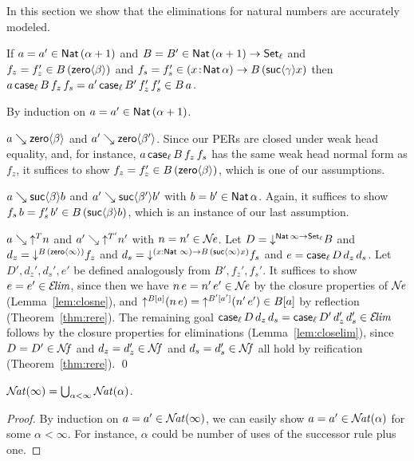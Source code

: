 \documentclass[acmlarge,review,anonymous]{acmart}\settopmatter{printfolios=true}
\makeatletter
\newenvironment{proof*}[1][\proofname]{\par
  \normalfont \topsep6\p@\@plus6\p@\relax
  \trivlist
  \item[\@proofindent\hskip\labelsep
        {\@proofnamefont #1\@addpunct{.}}]\ignorespaces
}{%
  \endtrivlist\@endpefalse
}
\makeatother
\begin{document}
In this section we show that the eliminations for natural numbers are accurately modeled.
\begin{lemma}[Case]
  \label{lem:case}
If\/ $a = a' \in \Nat (\alpha+1)$
and $B = B' \in \Nat (\alpha+1) \to \Set[\ell]$
and $f_z = f_z' \in B\,(\zero \beta)$
and $f_s = f_s' \in \funT x {\Nat \alpha} B\,(\suc \gamma x)$
then $a\,\case[\ell] B {f_z}{f_s} = a'\,\case[\ell] {B'} {f_z'}{f_s'} \in B\,a$.
\end{lemma}
\begin{proof*}
By induction on $a = a' \in \Nat(\alpha+1)$.
\begin{caselist}

\nextcase $a \evalsto \zero \beta$ and $a' \evalsto \zero{\beta'}$.
Since our PERs are closed under weak head equality,
and, for instance, $a\, \case[\ell] B {f_z}{f_s}$ has the same weak head normal form as $f_z$,
it suffices to show $f_z = f_z' \in B\,(\zero \beta)$, which is one of our assumptions.

\nextcase $a \evalsto \suc \beta b$ and $a' \evalsto \suc {\beta'}{b'}$ with $b = b' \in \Nat \alpha$.
Again, it suffices to show
$f_s\,b = f_s'\,b' \in B\,(\suc \beta b)$, which is an instance of our last assumption.

\nextcase $a \evalsto \up T n$ and $a' \evalsto \up {T'} n'$ with $n = n' \in \NE$.
Let $D = \down{\Nat \infty \to \Set[\ell]} B$
and $d_z = \down{B\,(\zero \infty)} f_z$
and $d_s = \down{\funS x {\Nat\,\infty} {B\,(\suc \infty x)}} f_s$
and $e = \case[\ell] D {d_z}{d_s}$.
Let $D',d_z',d_s',e'$ be defined analogously from $B',f_z',f_s'$.  It suffices to show $e = e' \in \ELIM$, since then we have $n\,e = n'\,e' \in \NE$ by the closure properties of $\NE$ (Lemma~\ref{lem:closne}),
and $\up{B[a]} (n\,e) = \up{B'[a']} (n'\,e') \in B[a]$ by reflection (Theorem~\ref{thm:rere}).
The remaining goal $\case[\ell] D {d_z}{d_s} = \case[\ell] {D'} {d_z'}{d_s'} \in \ELIM$ follows by the closure properties for eliminations (Lemma~\ref{lem:closelim}), since $D = D' \in \NF$ and $d_z = d_z' \in \NF$ and $d_s = d_s' \in \NF$ all hold by reification (Theorem~\ref{thm:rere}).
\qed
\end{caselist}
\end{proof*}

\begin{lemma}
  \label{lem:limit}
  $\NAT(\infty) = \bigcup_{\alpha < \infty} \NAT(\alpha)$.
\end{lemma}
\begin{proof}
  By induction on $a = a' \in \NAT(\infty)$, we can easily show $a = a' \in \NAT(\alpha)$ for some $\alpha < \infty$.
  For instance, $\alpha$ could be number of uses of the successor rule plus one.
\end{proof}
\end{document}
